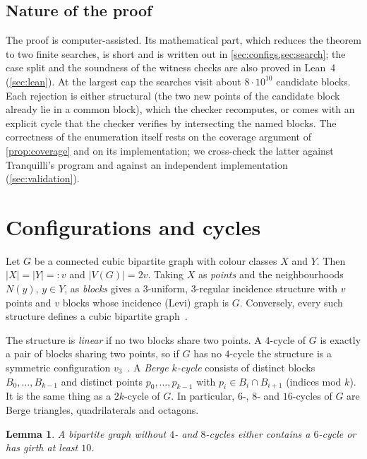 \documentclass[11pt]{amsart}
\newtheorem{lemma}[theorem]{Lemma}
\theoremstyle{definition}
\theoremstyle{remark}
\begin{document}
\subsection*{Nature of the proof}
The proof is computer-assisted. Its mathematical part, which reduces the
theorem to two finite searches, is short and is written out in
\cref{sec:configs,sec:search}; the case split and the soundness of the witness
checks are also proved in Lean~4 (\cref{sec:lean}). At the largest cap the searches
visit about $8\cdot 10^{10}$ candidate blocks. Each rejection is either structural (the two
new points of the candidate block already lie in a common block), which the
checker recomputes, or comes with an explicit cycle that the checker verifies
by intersecting the named blocks. The correctness of the
enumeration itself rests on the coverage argument of \cref{prop:coverage} and on
its implementation; we cross-check the latter against Tranquilli's program and
against an independent implementation (\cref{sec:validation}).

\section{Configurations and cycles}\label{sec:configs}

Let $G$ be a connected cubic bipartite graph with colour classes $X$ and $Y$.
Then $|X|=|Y|=:v$ and $|V(G)|=2v$. Taking $X$ as \emph{points} and the
neighbourhoods $N(y)$, $y\in Y$, as \emph{blocks} gives a $3$-uniform,
$3$-regular incidence structure with $v$ points and $v$ blocks whose incidence
(Levi) graph is $G$. Conversely, every such structure defines a cubic bipartite
graph~\cite[Prop.~3]{Tranquilli2026}.

The structure is \emph{linear} if no two blocks share two points. A $4$-cycle of
$G$ is exactly a pair of blocks sharing two points, so if $G$ has no $4$-cycle
the structure is a symmetric configuration $v_3$~\cite{BettenBrinkmannPisanski2000}.
A \emph{Berge $k$-cycle} consists of distinct blocks $B_0,\dots,B_{k-1}$ and
distinct points $p_0,\dots,p_{k-1}$ with $p_i\in B_i\cap B_{i+1}$ (indices mod
$k$). It is the same thing as a $2k$-cycle of $G$. In particular, $6$-, $8$- and
$16$-cycles of $G$ are Berge triangles, quadrilaterals and octagons.

\begin{lemma}\label{lem:dichotomy}
A bipartite graph without $4$- and $8$-cycles either contains a $6$-cycle or
has girth at least $10$.
\end{lemma}
\end{document}
